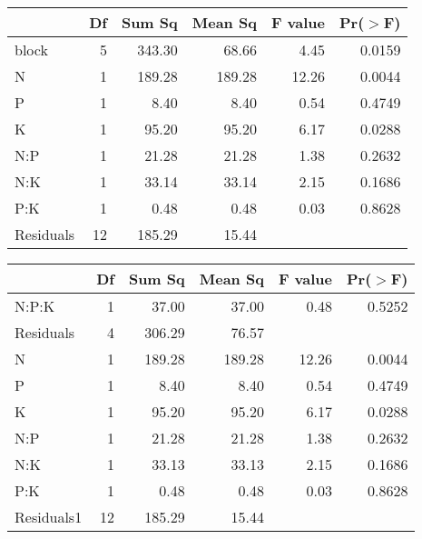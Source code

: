\begin{table}[ht]
\centering
\begin{tabular}{lrrrrr}
  \hline
 & Df & Sum Sq & Mean Sq & F value & Pr($>$F) \\ 
  \hline
block       & 5 & 343.30 & 68.66 & 4.45 & 0.0159 \\ 
  N           & 1 & 189.28 & 189.28 & 12.26 & 0.0044 \\ 
  P           & 1 & 8.40 & 8.40 & 0.54 & 0.4749 \\ 
  K           & 1 & 95.20 & 95.20 & 6.17 & 0.0288 \\ 
  N:P         & 1 & 21.28 & 21.28 & 1.38 & 0.2632 \\ 
  N:K         & 1 & 33.14 & 33.14 & 2.15 & 0.1686 \\ 
  P:K         & 1 & 0.48 & 0.48 & 0.03 & 0.8628 \\ 
  Residuals   & 12 & 185.29 & 15.44 &  &  \\ 
   \hline
\end{tabular}
\end{table}
\begin{table}[ht]
\centering
\begin{tabular}{lrrrrr}
  \hline
 & Df & Sum Sq & Mean Sq & F value & Pr($>$F) \\ 
  \hline
N:P:K     & 1 & 37.00 & 37.00 & 0.48 & 0.5252 \\ 
  Residuals & 4 & 306.29 & 76.57 &  &  \\ 
  N         & 1 & 189.28 & 189.28 & 12.26 & 0.0044 \\ 
  P         & 1 & 8.40 & 8.40 & 0.54 & 0.4749 \\ 
  K         & 1 & 95.20 & 95.20 & 6.17 & 0.0288 \\ 
  N:P       & 1 & 21.28 & 21.28 & 1.38 & 0.2632 \\ 
  N:K       & 1 & 33.13 & 33.13 & 2.15 & 0.1686 \\ 
  P:K       & 1 & 0.48 & 0.48 & 0.03 & 0.8628 \\ 
  Residuals1 & 12 & 185.29 & 15.44 &  &  \\ 
   \hline
\end{tabular}
\end{table}
